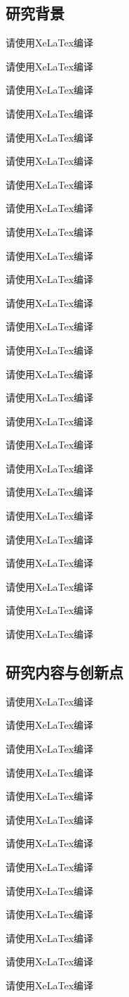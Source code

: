 \documentclass{ctexart}
\numberwithin{figure}{section}
\numberwithin{table}{section}
\numberwithin{equation}{section}
\begin{document}
\subsection{研究背景}
请使用XeLaTex编译

请使用XeLaTex编译

请使用XeLaTex编译

请使用XeLaTex编译

请使用XeLaTex编译

请使用XeLaTex编译

请使用XeLaTex编译

请使用XeLaTex编译

请使用XeLaTex编译

请使用XeLaTex编译

请使用XeLaTex编译

请使用XeLaTex编译

请使用XeLaTex编译

请使用XeLaTex编译

请使用XeLaTex编译

请使用XeLaTex编译

请使用XeLaTex编译

请使用XeLaTex编译

请使用XeLaTex编译

请使用XeLaTex编译

请使用XeLaTex编译

请使用XeLaTex编译

请使用XeLaTex编译

请使用XeLaTex编译

请使用XeLaTex编译

请使用XeLaTex编译
\subsection{研究内容与创新点}
请使用XeLaTex编译

请使用XeLaTex编译

请使用XeLaTex编译

请使用XeLaTex编译

请使用XeLaTex编译

请使用XeLaTex编译

请使用XeLaTex编译

请使用XeLaTex编译

请使用XeLaTex编译

请使用XeLaTex编译

请使用XeLaTex编译

请使用XeLaTex编译

请使用XeLaTex编译
\end{document}
